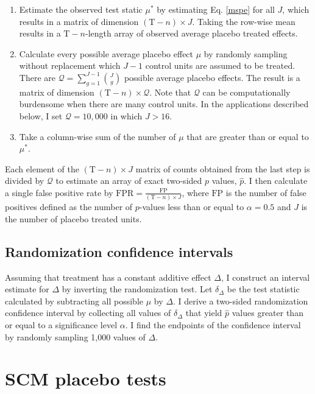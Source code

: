 \documentclass[hidelinks,12pt]{article}
\begin{document}
\begin{enumerate} 
	\item Estimate the observed test static $\mu^{*}$ by estimating Eq. \ref{mspe} for all $J$, which results in a matrix of dimension $(\text{T}-n) \times J$. Taking the row-wise mean results in a $\text{T}-n$-length array of observed average placebo treated effects. 
	\item Calculate every possible average placebo effect $\mu$ by randomly sampling without replacement which $J-1$ control units are assumed to be treated. There are $\mathcal{Q} = \sum\limits_{g=1}^{J-1} {J \choose g}$ possible average placebo effects. The result is a matrix of dimension $(\text{T}-n) \times \mathcal{Q}$. Note that $\mathcal{Q}$ can be computationally burdensome when there are many control units. In the applications described below, I set $\mathcal{Q} = 10,000$ in which $J > 16$.
	\item Take a column-wise sum of the number of $\mu$ that are greater than or equal to $\mu^{*}$.  
\end{enumerate}

Each element of the $(\text{T}-n) \times J$ matrix of counts obtained from the last step is divided by $\mathcal{Q}$ to estimate an array of exact two-sided $p$ values, $\hat{p}$. I then calculate a single false positive rate by $\text{FPR} = \frac{\text{FP}}{(\text{T}-n) \times J}$, where $\text{FP}$ is the number of false positives defined as the number of $p$-values less than or equal to $\alpha=0.5$ and $J$ is the number of placebo treated units.

\subsection{Randomization confidence intervals}

Assuming that treatment has a constant additive effect $\Delta$, I construct an interval estimate for $\Delta$ by inverting the randomization test. Let $\delta_\Delta$ be the test statistic calculated by subtracting all possible $\mu$ by $\Delta$. I derive a two-sided randomization confidence interval by collecting all values of $\delta_\Delta$ that yield $\hat{p}$ values greater than or equal to a significance level $\alpha$. I find the endpoints of the confidence interval by randomly sampling 1,000 values of $\Delta$.

\section{SCM placebo tests} \label{placebo}
\end{document}
